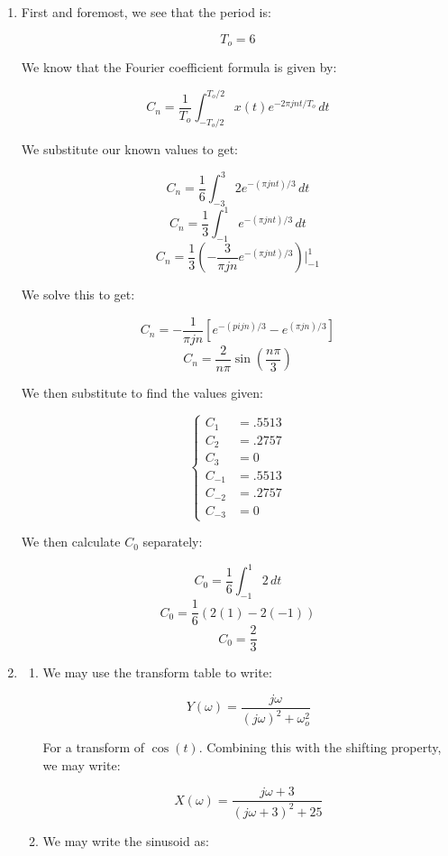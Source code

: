 \begin{enumerate}

  \item First and foremost, we see that the period is:

    $$T_o=6$$

    We know that the Fourier coefficient formula is given by:

    $$C_n=\frac{1}{T_o}\int_{-T_o/2}^{T_o/2}x(t)e^{-2\pi jnt/T_o}\,dt$$

    We substitute our known values to get:

    $$C_n=\frac{1}{6}\int_{-3}^{3} 2e^{-(\pi jnt)/3}\,dt$$
    $$C_n=\frac{1}{3}\int_{-1}^{1} e^{-(\pi jnt)/3}\,dt$$
    $$C_n=\frac{1}{3}\left(-\frac{3}{\pi jn} e^{-(\pi jnt)/3}\right)\Big|_{-1}^1$$

    We solve this to get:

    $$C_n=-\frac{1}{\pi jn} \left[e^{-(pi jn)/3} - e^{(\pi jn)/3}\right]$$
    $$\boxed{C_n=\frac{2}{n\pi}\sin\left( \frac{n\pi}{3} \right)}$$

    We then substitute to find the values given:

    $$\boxed{\left\{\begin{array}{ll} C_1&= .5513\\ C_2&= .2757\\ C_3&= 0\\ C_{-1}&= .5513\\ C_{-2}&= .2757\\C_{-3}&=0\end{array}}$$

      We then calculate $C_0$ separately:

      $$C_0=\frac{1}{6}\int_{-1}^{1}2\,dt$$
      $$C_0=\frac{1}{6}(2(1)-2(-1))$$
      $$\boxed{C_0=\frac{2}{3}}$$

  \item

    \begin{enumerate}

      \item We may use the transform table to write:

        $$Y(\omega)=\frac{j\omega}{(j\omega)^2+\omega_o^2}$$

        For a transform of $\cos(t)$. Combining this with the shifting property, we may write:

        $$\boxed{X(\omega)=\frac{j\omega + 3}{(j\omega+3)^2+25}}$$

      \item We may write the sinusoid as:


\end{enumerate}
\end{enumerate}
